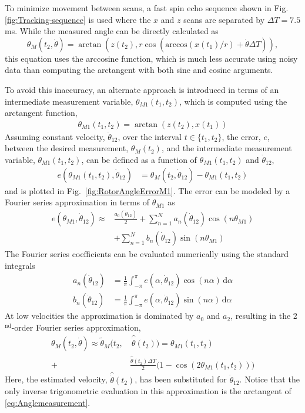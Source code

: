 \documentclass[journal]{IEEEtran}
\begin{document}
To minimize movement between scans, a fast spin echo sequence shown in Fig. \ref{fig:Tracking-sequence} is used where the $x$ and $z$ scans are separated by $\Delta T = 7.5$ms. While the measured angle can be directly calculated as
\begin{equation}
\theta_M(t_2, \dot{\theta}) =\arctan\!\left( z(t_2), r\cos\! \left(\mathrm{arccos}(x(t_1)/r)+\dot{\theta} \Delta T \right) \right),
\label{eq:timefix}
\end{equation}
this equation uses the arccosine function, which is much less accurate using noisy data than computing the arctangent with both sine and cosine arguments. 

To avoid this inaccuracy, an alternate approach is introduced in terms of an intermediate measurement variable, $\theta_{M1}(t_1, t_2)$, which is computed using the arctangent function, 
\begin{align}
\theta_{M1}(t_1,t_2) = \arctan( z(t_2), x(t_1))
\label{eq:Anglemeasurement}
\end{align}
Assuming constant velocity, $\dot{\theta}_{12}$, over the interval $t\in\{t_1,t_2\}$, the error, $e$, between the desired measurement, $\theta_M (t_2)$, and the intermediate measurement variable, $\theta_{M1}(t_1,t_2)$, can be defined as a function of $\theta_{M1}(t_1,t_2)$ and $\dot{\theta}_{12}$,
\begin{align}
e(\theta_{M1}(t_1,t_2),\dot{\theta}_{12}) &= \theta_M(t_2,\dot{\theta}_{12}) - \theta_{M1}(t_1,t_2) 
\end{align}
and is plotted in Fig.~\ref{fig:RotorAngleErrorM1}. The error can be modeled by a Fourier series approximation in terms of $\theta_{M1}$ as
\begin{align}
e(\theta_{M1} , \dot{\theta}_{12}) \approx & \frac{a_0(\dot{\theta}_{12})}{2} + \sum_{n=1}^N a_n(\dot{\theta}_{12}) \cos(n \theta_{M1}) \nonumber \\
& + \sum_{n=1}^N b_n(\dot{\theta}_{12}) \sin(n \theta_{M1})
\end{align}
The Fourier series coefficients can be evaluated numerically using the standard integrals
\begin{align}
a_n(\dot{\theta}_{12}) & =  \frac{1}{\pi}\int_{-\pi}^{\pi} e(\alpha,\dot{\theta}_{12})\cos(n\alpha) \,\textrm{d}\alpha \nonumber\\
b_n(\dot{\theta}_{12}) & =  \frac{1}{\pi}\int_{-\pi}^{\pi} e(\alpha,\dot{\theta}_{12})\sin(n\alpha) \,\textrm{d}\alpha
\end{align}
At low velocities the approximation is dominated by $a_0$ and $a_2$, resulting in the 2$^{\text{nd}}$-order Fourier series approximation,
\begin{align}
\theta_M(t_2, \dot{\theta}) \approx \tilde{\theta}_M(t_2,  & \ \hat{\dot{\theta}}(t_2)) =  \theta_{M1}(t_1,t_2)  \nonumber \\
 +& \frac{\hat{\dot{\theta}}(t_2) \Delta T}{2}\Big(1-\cos(2\theta_{M1}(t_1,t_2))\Big) 
\label{eq:AnglemeasurementCorrected}
\end{align}
Here, the estimated velocity, $\hat{\dot{\theta}}(t_2)$, has been substituted for $\dot{\theta}_{12}$. Notice that the only inverse trigonometric evaluation in this approximation is the arctangent of \eqref{eq:Anglemeasurement}.
\end{document}
